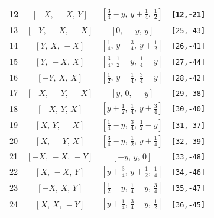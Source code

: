\documentclass[fleqn,8pt]{jsarticle}
\begin{document}
\begin{longtable}{cccc}
12 & $\left[ - X,\, - X,\, Y \right]$ & $\left[ \frac{3}{4} - y,\, y + \frac{1}{4},\, \frac{1}{2} \right]$ & {\tt [12,-21]} \\ \hline
13 & $\left[ - Y,\, - X,\, - X \right]$ & $\left[ 0,\, - y,\, y \right]$ & {\tt [25,-43]} \\ \hline
14 & $\left[ Y,\, X,\, - X \right]$ & $\left[ \frac{1}{4},\, y + \frac{3}{4},\, y + \frac{1}{2} \right]$ & {\tt [26,-41]} \\ \hline
15 & $\left[ Y,\, - X,\, X \right]$ & $\left[ \frac{3}{4},\, \frac{1}{2} - y,\, \frac{1}{4} - y \right]$ & {\tt [27,-44]} \\ \hline
16 & $\left[ - Y,\, X,\, X \right]$ & $\left[ \frac{1}{2},\, y + \frac{1}{4},\, \frac{3}{4} - y \right]$ & {\tt [28,-42]} \\ \hline
17 & $\left[ - X,\, - Y,\, - X \right]$ & $\left[ y,\, 0,\, - y \right]$ & {\tt [29,-38]} \\ \hline
18 & $\left[ - X,\, Y,\, X \right]$ & $\left[ y + \frac{1}{2},\, \frac{1}{4},\, y + \frac{3}{4} \right]$ & {\tt [30,-40]} \\ \hline
19 & $\left[ X,\, Y,\, - X \right]$ & $\left[ \frac{1}{4} - y,\, \frac{3}{4},\, \frac{1}{2} - y \right]$ & {\tt [31,-37]} \\ \hline
20 & $\left[ X,\, - Y,\, X \right]$ & $\left[ \frac{3}{4} - y,\, \frac{1}{2},\, y + \frac{1}{4} \right]$ & {\tt [32,-39]} \\ \hline
21 & $\left[ - X,\, - X,\, - Y \right]$ & $\left[ - y,\, y,\, 0 \right]$ & {\tt [33,-48]} \\ \hline
22 & $\left[ X,\, - X,\, Y \right]$ & $\left[ y + \frac{3}{4},\, y + \frac{1}{2},\, \frac{1}{4} \right]$ & {\tt [34,-46]} \\ \hline
23 & $\left[ - X,\, X,\, Y \right]$ & $\left[ \frac{1}{2} - y,\, \frac{1}{4} - y,\, \frac{3}{4} \right]$ & {\tt [35,-47]} \\ \hline
24 & $\left[ X,\, X,\, - Y \right]$ & $\left[ y + \frac{1}{4},\, \frac{3}{4} - y,\, \frac{1}{2} \right]$ & {\tt [36,-45]} \\
\end{longtable}
\renewcommand{\arraystretch}{1.2}
\end{document}
